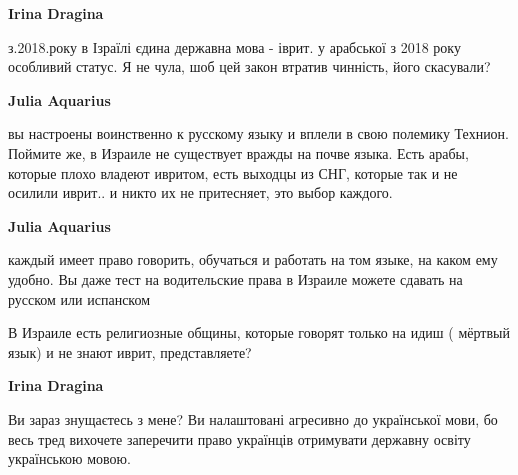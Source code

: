\begin{itemize}
\begin{itemize}
 
\textbf{Irina Dragina} 

з.2018.року в Ізраїлі єдина державна мова - іврит. у арабської з 2018 року
особливий статус. Я не чула, шоб цей закон втратив чинність, його скасували?


 
\textbf{Julia Aquarius} 

вы настроены воинственно к русскому языку и вплели в свою полемику Технион.
Поймите же, в Израиле не существует вражды на почве языка. Есть арабы, которые
плохо владеют ивритом, есть выходцы из СНГ, которые так и не осилили иврит.. и
никто их не притесняет, это выбор каждого.


 
\textbf{Julia Aquarius} 

каждый имеет право говорить, обучаться и работать на том языке, на каком ему
удобно. Вы даже тест на водительские права в Израиле можете сдавать на русском
или испанском


 

В Израиле есть религиозные общины, которые говорят только на идиш ( мёртвый
язык) и не знают иврит, представляете?

 
\textbf{Irina Dragina} 

Ви зараз знущаєтесь з мене? Ви налаштовані агресивно до української мови, бо
весь тред вихочете заперечити право українців отримувати державну освіту
українською мовою. 


\end{itemize}
\end{itemize}
